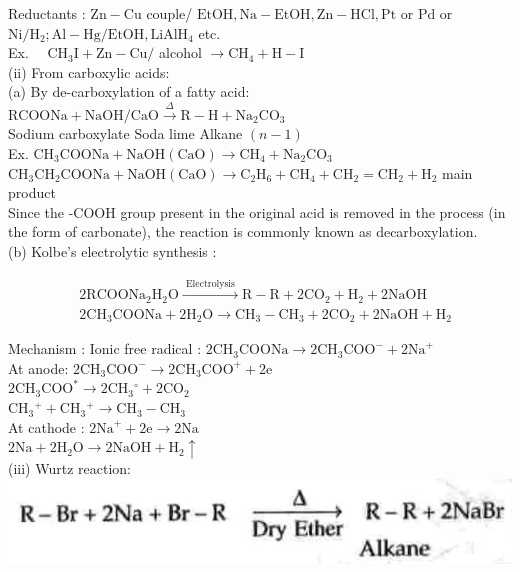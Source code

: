 \documentclass[10pt]{article}
\begin{document}
Reductants : $\mathrm{Zn}-\mathrm{Cu}$ couple/ $\mathrm{EtOH}, \mathrm{Na}-\mathrm{EtOH}, \mathrm{Zn}-\mathrm{HCl}, \mathrm{Pt}$ or Pd or $\mathrm{Ni} / \mathrm{H}_{2} ; \mathrm{Al}-\mathrm{Hg} / \mathrm{EtOH}, \mathrm{LiAlH}_{4}$ etc.\\
Ex. $\quad \mathrm{CH}_{3} \mathrm{I}+\mathrm{Zn}-\mathrm{Cu} /$ alcohol $\rightarrow \mathrm{CH}_{4}+\mathrm{H}-\mathrm{I}$\\
(ii) From carboxylic acids:\\
(a) By de-carboxylation of a fatty acid:\\
$\mathrm{RCOONa}+\mathrm{NaOH} / \mathrm{CaO} \xrightarrow{\Delta} \mathrm{R}-\mathrm{H}+\mathrm{Na}_{2} \mathrm{CO}_{3}$\\
Sodium carboxylate Soda lime Alkane $(n-1)$\\
Ex. $\mathrm{CH}_{3} \mathrm{COONa}+\mathrm{NaOH}(\mathrm{CaO}) \longrightarrow \mathrm{CH}_{4}+\mathrm{Na}_{2} \mathrm{CO}_{3}$\\
$\mathrm{CH}_{3} \mathrm{CH}_{2} \mathrm{COONa}+\mathrm{NaOH}(\mathrm{CaO}) \longrightarrow \mathrm{C}_{2} \mathrm{H}_{6}+\mathrm{CH}_{4}+\mathrm{CH}_{2}=\mathrm{CH}_{2}+\mathrm{H}_{2}$ main product\\
Since the -COOH group present in the original acid is removed in the process (in the form of carbonate), the reaction is commonly known as decarboxylation.\\
(b) Kolbe's electrolytic synthesis :

$$
\begin{aligned}
& 2 \mathrm{RCOONa}_{2} \mathrm{H}_{2} \mathrm{O} \xrightarrow{\text { Electrolysis }} \mathrm{R}-\mathrm{R}+2 \mathrm{CO}_{2}+\mathrm{H}_{2}+2 \mathrm{NaOH} \\
& 2 \mathrm{CH}_{3} \mathrm{COONa}+2 \mathrm{H}_{2} \mathrm{O} \longrightarrow \mathrm{CH}_{3}-\mathrm{CH}_{3}+2 \mathrm{CO}_{2}+2 \mathrm{NaOH}+\mathrm{H}_{2}
\end{aligned}
$$

Mechanism : Ionic free radical : $2 \mathrm{CH}_{3} \mathrm{COONa} \longrightarrow 2 \mathrm{CH}_{3} \mathrm{COO}^{-}+2 \mathrm{Na}^{+}$\\
At anode: $2 \mathrm{CH}_{3} \mathrm{COO}^{-} \longrightarrow 2 \mathrm{CH}_{3} \mathrm{COO}^{+}+2 \mathrm{e}$\\
$2 \mathrm{CH}_{3} \mathrm{COO}^{*} \longrightarrow 2 \mathrm{CH}_{3}{ }^{\circ}+2 \mathrm{CO}_{2}$\\
$\mathrm{CH}_{3}{ }^{+}+\mathrm{CH}_{3}{ }^{+} \longrightarrow \mathrm{CH}_{3}-\mathrm{CH}_{3}$\\
At cathode : $2 \mathrm{Na}^{+}+2 \mathrm{e} \longrightarrow 2 \mathrm{Na}$\\
$2 \mathrm{Na}+2 \mathrm{H}_{2} \mathrm{O} \longrightarrow 2 \mathrm{NaOH}+\mathrm{H}_{2} \uparrow$\\
(iii) Wurtz reaction:\\
\includegraphics[max width=\textwidth, center]{2025_01_28_8470952b98110cec3aabg-171}
\end{document}
